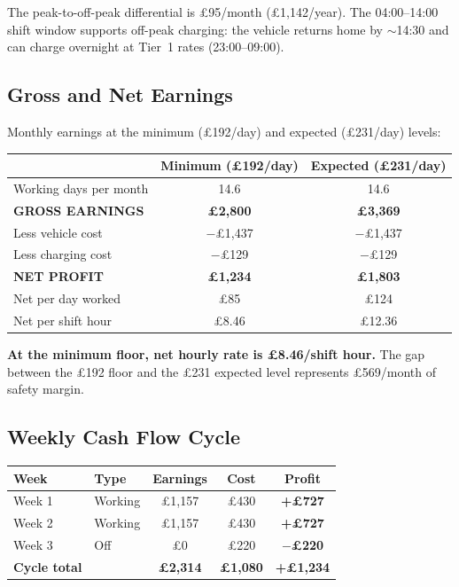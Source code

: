 \documentclass[a4paper,11pt]{article}
\begin{document}
\medskip
The peak-to-off-peak differential is \pounds95/month (\pounds1,142/year). The 04:00--14:00 shift window supports off-peak charging: the vehicle returns home by $\sim$14:30 and can charge overnight at Tier~1 rates (23:00--09:00).

\subsection{Gross and Net Earnings}

Monthly earnings at the minimum (\pounds192/day) and expected (\pounds231/day) levels:

\begin{tabularx}{\textwidth}{X C C}
\toprule
& \textbf{Minimum (\pounds192/day)} & \textbf{Expected (\pounds231/day)} \\
\midrule
Working days per month & 14.6 & 14.6 \\
\textbf{GROSS EARNINGS} & \textbf{\pounds2,800} & \textbf{\pounds3,369} \\
Less vehicle cost & $-$\pounds1,437 & $-$\pounds1,437 \\
Less charging cost & $-$\pounds129 & $-$\pounds129 \\
 \textbf{NET PROFIT} & \textbf{\pounds1,234} & \textbf{\pounds1,803} \\
Net per day worked & \pounds85 & \pounds124 \\
Net per shift hour & \pounds8.46 & \pounds12.36 \\
\bottomrule
\end{tabularx}

\medskip
\textbf{At the minimum floor, net hourly rate is \pounds8.46/shift hour.} The gap between the \pounds192 floor and the \pounds231 expected level represents \pounds569/month of safety margin.

\subsection{Weekly Cash Flow Cycle}

\begin{tabularx}{\textwidth}{l l C C C}
\toprule
\textbf{Week} & \textbf{Type} & \textbf{Earnings} & \textbf{Cost} & \textbf{Profit} \\
\midrule
Week 1 & Working & \pounds1,157 & \pounds430 & \textbf{+\pounds727} \\
Week 2 & Working & \pounds1,157 & \pounds430 & \textbf{+\pounds727} \\
Week 3 & Off & \pounds0 & \pounds220 & \textbf{$-$\pounds220} \\
\midrule
{} \textbf{Cycle total} & & \textbf{\pounds2,314} & \textbf{\pounds1,080} & \textbf{+\pounds1,234} \\
\bottomrule
\end{tabularx}
\end{document}
